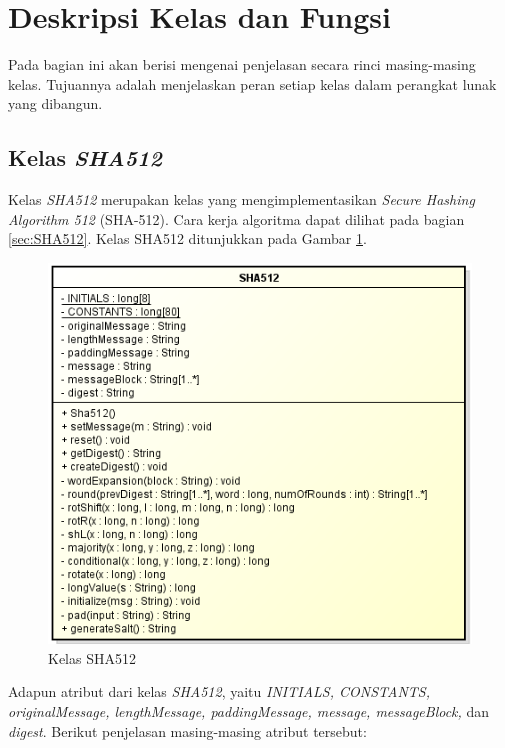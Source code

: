 \section{Deskripsi Kelas dan Fungsi}

Pada bagian ini akan berisi mengenai penjelasan secara rinci masing-masing kelas. Tujuannya adalah menjelaskan peran setiap kelas dalam perangkat lunak yang dibangun.

\subsection{Kelas \textit{SHA512}}

Kelas \textit{SHA512} merupakan kelas yang mengimplementasikan \textit{Secure Hashing Algorithm 512} (SHA-512). Cara kerja algoritma dapat dilihat pada bagian \ref{sec:SHA512}. Kelas SHA512 ditunjukkan pada Gambar \ref{fig:classsha512}.

\begin{figure}[H]
	\centering
	\includegraphics[scale=0.5]{Gambar/class_sha512}
	\caption{Kelas SHA512}\label{fig:classsha512}
\end{figure}

Adapun atribut dari kelas \textit{SHA512}, yaitu \textit{INITIALS, CONSTANTS, originalMessage, lengthMessage, paddingMessage, message, messageBlock,} dan \textit{digest}. Berikut penjelasan masing-masing atribut tersebut:

